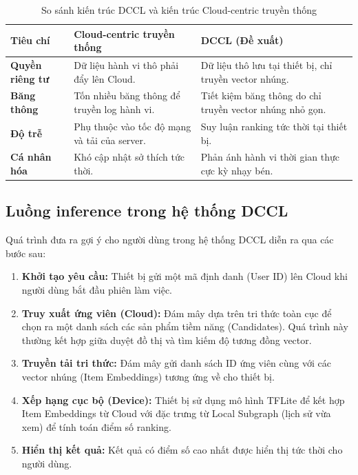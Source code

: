 \begin{table}[h!]
    \centering
    \caption{So sánh kiến trúc DCCL và kiến trúc Cloud-centric truyền thống}
    \renewcommand{\arraystretch}{1.5}
    \begin{tabularx}{\textwidth}{|l|X|X|}
        \hline
        \textbf{Tiêu chí} & \textbf{Cloud-centric truyền thống} & \textbf{DCCL (Đề xuất)} \\ \hline
        \textbf{Quyền riêng tư} & Dữ liệu hành vi thô phải đẩy lên Cloud. & Dữ liệu thô lưu tại thiết bị, chỉ truyền vector nhúng. \\ \hline
        \textbf{Băng thông} & Tốn nhiều băng thông để truyền log hành vi. & Tiết kiệm băng thông do chỉ truyền vector nhúng nhỏ gọn. \\ \hline
        \textbf{Độ trễ} & Phụ thuộc vào tốc độ mạng và tải của server. & Suy luận ranking tức thời tại thiết bị. \\ \hline
        \textbf{Cá nhân hóa} & Khó cập nhật sở thích tức thời. & Phản ánh hành vi thời gian thực cực kỳ nhạy bén. \\ \hline
    \end{tabularx}
    \label{tab:dccl_vs_traditional}
\end{table}

\subsection{Luồng inference trong hệ thống DCCL}

Quá trình đưa ra gợi ý cho người dùng trong hệ thống DCCL diễn ra qua các bước sau:

\begin{enumerate}
    \item \textbf{Khởi tạo yêu cầu:} Thiết bị gửi một mã định danh (User ID) lên Cloud khi người dùng bắt đầu phiên làm việc.
    \item \textbf{Truy xuất ứng viên (Cloud):} Đám mây dựa trên tri thức toàn cục để chọn ra một danh sách các sản phẩm tiềm năng (Candidates). Quá trình này thường kết hợp giữa duyệt đồ thị và tìm kiếm độ tương đồng vector.
    \item \textbf{Truyền tải tri thức:} Đám mây gửi danh sách ID ứng viên cùng với các vector nhúng (Item Embeddings) tương ứng về cho thiết bị.
    \item \textbf{Xếp hạng cục bộ (Device):} Thiết bị sử dụng mô hình TFLite để kết hợp Item Embeddings từ Cloud với đặc trưng từ Local Subgraph (lịch sử vừa xem) để tính toán điểm số ranking.
    \item \textbf{Hiển thị kết quả:} Kết quả có điểm số cao nhất được hiển thị tức thời cho người dùng.
\end{enumerate}

